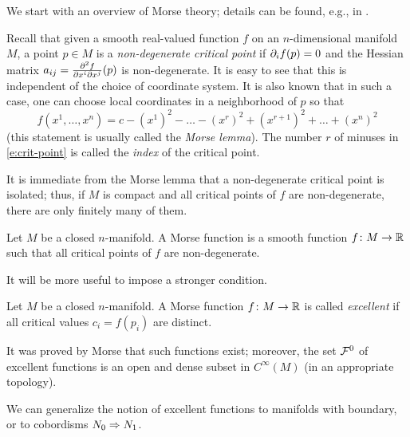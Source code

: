 We start with an overview of Morse theory; details can be found, e.g., in
\cite{matsumoto}.

Recall that given a smooth real-valued function $f$ on an $n$-dimensional
manifold $M$, a point $p\in M$ is a \emph{non-degenerate critical point}
 if
$\del_i f (p)=0$ and the Hessian matrix
$a_{ij}=\frac{\del^2 f}{\del x^i \del x^j}(p)$ is non-degenerate. It is easy to
see that this is independent of the choice of coordinate system. It is also
known that in such a case, one can choose local coordinates in a neighborhood
of $p$ so that
\begin{equation}\label{e:crit-point}
  f(x^1, \dots, x^n)=c-(x^1)^2 -\dots -(x^r)^2
  + (x^{r+1})^2+ \dots + (x^n)^2
\end{equation}
(this statement is usually called the \emph{Morse lemma}).
The number $r$ of minuses in \eqref{e:crit-point} is called the \emph{index}
of the critical point.

It is immediate from the Morse lemma that a non-degenerate critical point
is isolated; thus, if $M$ is compact and all critical points of $f$ are
non-degenerate, there are only finitely many of them.

\begin{definition}\label{d:morse_function}
  Let $M$ be a closed $n$-manifold. A Morse function is a
  smooth function $f\colon M\to \R$ such that all critical points
  of $f$ are non-degenerate.
\end{definition}

It will be more useful to impose a stronger condition.

\begin{definition}\label{d:morse_function2}
  Let $M$ be a closed $n$-manifold. A Morse function $f\colon M\to \R$
  is called \emph{excellent} if all critical
  values $c_i=f(p_i)$ are distinct.
\end{definition}

It was proved by Morse that such functions exist; moreover, the set $\calF^0$
of excellent functions is an open and dense subset in $C^\infty(M)$
(in an appropriate topology).

We can generalize the notion of excellent functions to manifolds with boundary,
or to cobordisms $N_0\cob{M} N_1$.

